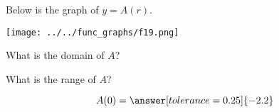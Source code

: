 \documentclass{ximera}
\author{Lee Wayand}
\begin{document}
\begin{exercise}  





Below is the graph of $y=A(r)$.  

\begin{image}
\texttt{[image: ../../func\_graphs/f19.png]}
\end{image}









\begin{question} 


What is the domain of $A$?\\


\begin{multipleChoice}
\choice {$[-9, 9]$}
\choice [correct]{$(-\infty, \infty)$}
\end{multipleChoice}

\end{question}






\begin{question} 


What is the range of $A$?\\


\begin{multipleChoice}
\choice {$(-\infty, \infty)$}
\choice {$(-\infty, 3] \cup (3, \infty)$}
\choice {$[-3.8, \infty)$}
\choice [correct]{$[-3.8, 0) \cup (0, \infty)$}
\end{multipleChoice}


\end{question}









\begin{question} 



\[  A(0) = \answer[tolerance=0.25]{-2.2}  \]

\end{question}










\begin{question} 




\end{question}
\end{exercise}
\end{document}
